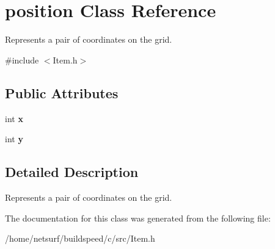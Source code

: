 \hypertarget{structposition}{}\section{position Class Reference}
\label{structposition}


Represents a pair of coordinates on the grid.  




{\ttfamily \#include $<$Item.\+h$>$}

\subsection*{Public Attributes}
\begin{DoxyCompactItemize}
\item 
int {\bfseries x}\hypertarget{structposition_aad0117268685890818989a6c0112ab8a}{}\label{structposition_aad0117268685890818989a6c0112ab8a}

\item 
int {\bfseries y}\hypertarget{structposition_ab7163210f8aa5e8dc68ef434a315792c}{}\label{structposition_ab7163210f8aa5e8dc68ef434a315792c}

\end{DoxyCompactItemize}


\subsection{Detailed Description}
Represents a pair of coordinates on the grid. 

The documentation for this class was generated from the following file\+:\begin{DoxyCompactItemize}
\item 
/home/netsurf/buildspeed/c/src/Item.\+h\end{DoxyCompactItemize}
